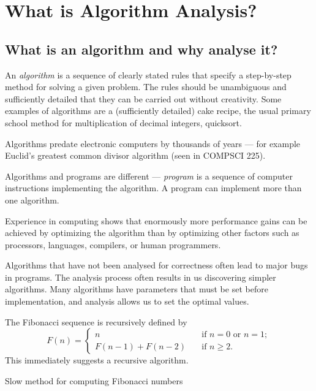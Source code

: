 \part{What is Algorithm Analysis?} \label{ch:alganal}


\chapter{What is an algorithm and why analyse it?} %

An \emph{algorithm} is a sequence of clearly stated rules that
specify a step-by-step method for solving a given problem.
The rules should be unambiguous and
sufficiently detailed that they can be carried out without creativity.
Some examples of algorithms are a (sufficiently detailed) cake recipe,
the usual primary school method for multiplication of decimal integers, quicksort.

Algorithms predate electronic computers by thousands of years --- for example
Euclid's greatest common divisor algorithm (seen in COMPSCI 225).

Algorithms and programs are different --- \emph{program} is a sequence of computer instructions implementing 
the algorithm. A program can implement more than one algorithm.

Experience in computing shows that enormously more performance gains can be achieved 
by optimizing the algorithm than by optimizing other factors such as
processors, languages, compilers, or human programmers.

Algorithms that have not been analysed for correctness often lead to 
major bugs in programs. The analysis process often results in us discovering simpler algorithms.
Many algorithms have parameters that must be set before implementation, and analysis allows us to set the optimal values.


\begin{Example}
The Fibonacci sequence is recursively defined by 
$$
F(n) = 
  \left\{\begin{array}{ll}
	n & \quad \text{if } n = 0 \text{ or } n = 1; \\ 
    F(n - 1) + F(n - 2) & \quad \text{if } n \geq 2 \text{.}
  \end{array}
  \right.
$$
This immediately suggests a recursive algorithm.
\end{Example}

\begin{algorithm}[H]
  \caption{Slow method for computing Fibonacci numbers} 
  \label{alg:slowfib}
\begin{algorithmic}[1]
\EndIf
\EndFunction
\end{algorithmic}
\end{algorithm}

